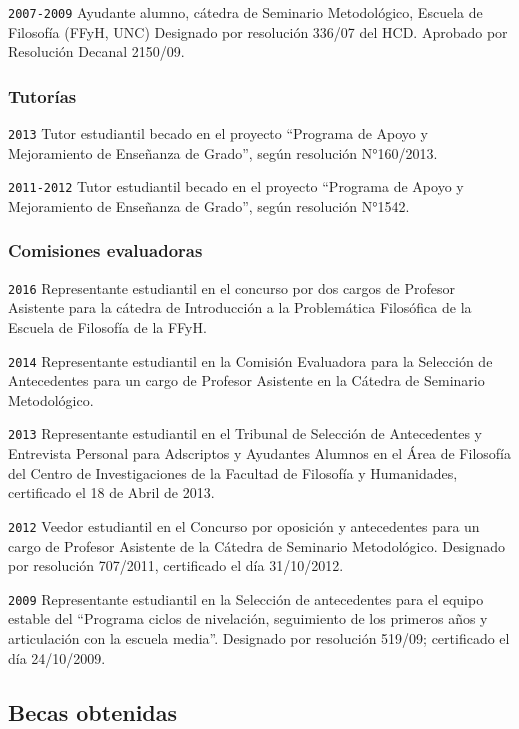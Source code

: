 \documentclass[]{article}
\begin{document}
\texttt{2007-2009} Ayudante alumno, cátedra de Seminario Metodológico,
Escuela de Filosofía (FFyH, UNC) Designado por resolución 336/07 del
HCD. Aprobado por Resolución Decanal 2150/09.

\hypertarget{tutoruxedas}{%
\subsubsection{Tutorías}\label{tutoruxedas}}

\texttt{2013} Tutor estudiantil becado en el proyecto ``Programa de
Apoyo y Mejoramiento de Enseñanza de Grado'', según resolución
N°160/2013.

\texttt{2011-2012} Tutor estudiantil becado en el proyecto ``Programa de
Apoyo y Mejoramiento de Enseñanza de Grado'', según resolución N°1542.

\hypertarget{comisiones-evaluadoras}{%
\subsubsection{Comisiones evaluadoras}\label{comisiones-evaluadoras}}

\texttt{2016} Representante estudiantil en el concurso por dos cargos de
Profesor Asistente para la cátedra de Introducción a la Problemática
Filosófica de la Escuela de Filosofía de la FFyH.

\texttt{2014} Representante estudiantil en la Comisión Evaluadora para
la Selección de Antecedentes para un cargo de Profesor Asistente en la
Cátedra de Seminario Metodológico.

\texttt{2013} Representante estudiantil en el Tribunal de Selección de
Antecedentes y Entrevista Personal para Adscriptos y Ayudantes Alumnos
en el Área de Filosofía del Centro de Investigaciones de la Facultad de
Filosofía y Humanidades, certificado el 18 de Abril de 2013.

\texttt{2012} Veedor estudiantil en el Concurso por oposición y
antecedentes para un cargo de Profesor Asistente de la Cátedra de
Seminario Metodológico. Designado por resolución 707/2011, certificado
el día 31/10/2012.

\texttt{2009} Representante estudiantil en la Selección de antecedentes
para el equipo estable del ``Programa ciclos de nivelación, seguimiento
de los primeros años y articulación con la escuela media''. Designado
por resolución 519/09; certificado el día 24/10/2009.

\hypertarget{becas-obtenidas}{%
\subsection{Becas obtenidas}\label{becas-obtenidas}}
\end{document}
